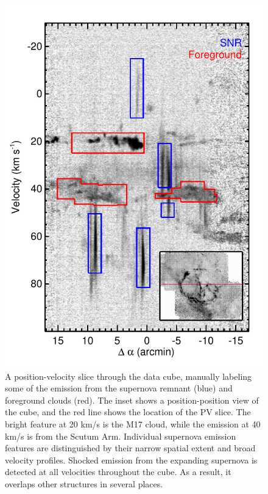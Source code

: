 \begin{figure}
\includegraphics{slice}
\caption{A position-velocity slice through the data cube, manually labeling some of the emission from the supernova remnant (blue) and foreground clouds (red). The inset shows a position-position view of the cube, and the red line shows the location of the PV slice. The bright feature at 20 km/s is the M17 cloud, while the emission at 40 km/s is from the Scutum Arm. Individual supernova emission features are distinguished by their narrow spatial extent and broad velocity profiles.  Shocked emission from the expanding supernova is detected at all velocities throughout the cube. As a result, it overlaps other structures in several places.}
\label{fig:slice}
\end{figure}

